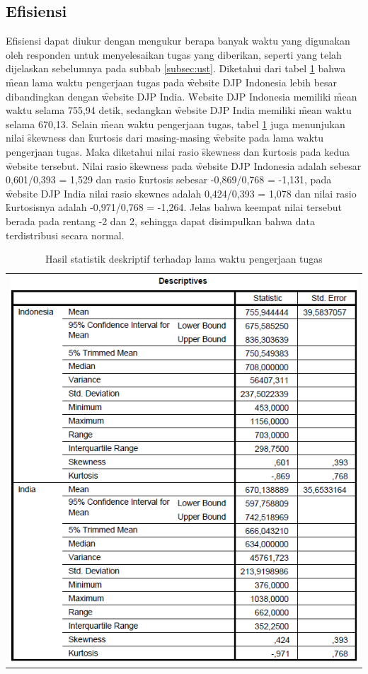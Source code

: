 \subsection{Efisiensi}
Efisiensi dapat diukur dengan mengukur berapa banyak waktu yang digunakan oleh responden untuk menyelesaikan tugas yang diberikan, seperti yang telah dijelaskan sebelumnya pada subbab \ref{subsec:ust}. Diketahui dari tabel \ref{tab:descwaktu} bahwa \f{mean} lama waktu pengerjaan tugas pada \f{website} DJP Indonesia lebih besar dibandingkan dengan \f{website} DJP India. \f{Website} DJP Indonesia memiliki \f{mean} waktu selama 755,94 detik, sedangkan \f{website} DJP India memiliki \f{mean} waktu selama 670,13. Selain \f{mean} waktu pengerjaan tugas, tabel \ref{tab:descwaktu} juga menunjukan nilai \f{skewness} dan \f{kurtosis} dari masing-masing \f{website} pada lama waktu pengerjaan tugas. Maka diketahui nilai rasio \f{skewness} dan \f{kurtosis} pada kedua \f{website} tersebut. Nilai rasio \f{skewness} pada \f{website} DJP Indonesia adalah sebesar 0,601/0,393 = 1,529 dan rasio \f{kurtosis} sebesar -0,869/0,768 = -1,131, pada \f{website} DJP India nilai rasio skewnes adalah 0,424/0,393 = 1,078 dan nilai rasio \f{kurtosis}nya adalah -0,971/0,768 = -1,264. Jelas bahwa keempat nilai tersebut berada pada rentang -2 dan 2, sehingga dapat disimpulkan bahwa data terdistribusi secara normal. 
\begin{table}
	\centering
	\caption{Hasil statistik deskriptif terhadap lama waktu pengerjaan tugas}
	\label{tab:descwaktu}
	\begin{tabular}{c}
		\includegraphics[width=\textwidth]
		{pics/waktudesc.PNG}
	\end{tabular}
\end{table}
